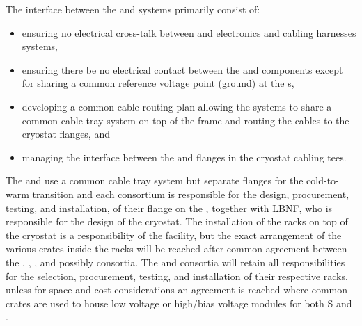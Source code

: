 The interface between the  and  systems primarily consist of:

\begin{itemize}
    \item ensuring no electrical cross-talk between  and  electronics and cabling harnesses systems,
    \item ensuring there be no electrical contact between the  and  components except for sharing a common reference voltage point (ground) at the \fdth{}s,
    \item developing a common cable routing plan allowing the systems to share a common cable tray system on top of the  frame and routing the cables to the cryostat flanges, and 



    \item managing the interface between the  and  flanges in the cryostat cabling tees.
  
  \end{itemize}  
The  and  use a common cable tray system but separate flanges for the cold-to-warm transition and each consortium is responsible for the design, procurement, testing, and installation, of their flange on the \fdth{}, together with LBNF, who is responsible for the design of the cryostat. 
The installation of the racks on top of the cryostat is a responsibility of the facility, but the exact arrangement of the various crates inside the racks will be reached after common agreement between the , , , and possibly  consortia. The  and  consortia will retain all responsibilities for the selection, procurement, testing, and installation of their respective racks, unless for space and cost considerations an agreement is reached where common crates are used to house low voltage or high/bias voltage modules for both S and . 



